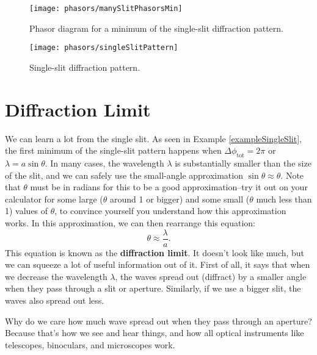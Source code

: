 \begin{figure}[t]
\begin{center}\texttt{[image: phasors/manySlitPhasorsMin]}
\end{center}
\caption{\label{manySlitPhasorsMinFig}Phasor diagram for a minimum of the
single-slit diffraction pattern.}
\end{figure}

\begin{figure}[b]
\begin{center}\texttt{[image: phasors/singleSlitPattern]}
\end{center}
\caption{\label{singleSlitFig}Single-slit diffraction pattern.}
\end{figure}





\section{Diffraction Limit}

We can learn a lot from the single slit. As seen in Example \ref{exampleSingleSlit},
the first minimum of the single-slit pattern happens when
$\Delta\phi_\text{tot}= 2\pi$ or
$\lambda = a\sin\theta$.  In many cases, the wavelength $\lambda$ is substantially
smaller than the size of the slit, and we can safely use the small-angle approximation
$\sin\theta\approx\theta$.  Note that $\theta$ must be in radians for this to 
be a good approximation--try it out on your calculator for some large ($\theta$
around 1 or bigger) and some small ($\theta$ much less than 1) values of $\theta$,
to convince yourself you understand how this approximation works.
In this approximation, we can then rearrange this equation:
\begin{equation}
\theta \approx \frac{\lambda}{a}
.\end{equation}
This equation is known as the \textbf{diffraction limit}.
It   doesn't look  like much,  but we can  squeeze a  lot of
useful information out of it.  First of all, it says that when we decrease 
the wavelength $\lambda$, the waves spread out (diffract) by a smaller angle 
when they pass through a  slit or aperture. Similarly, if we use a bigger slit, 
the waves also spread out less. 

Why do we care how much wave spread out when they pass through an aperture?  
Because that's how we see and hear things, and how all optical instruments like
telescopes, binoculars, and microscopes work.

